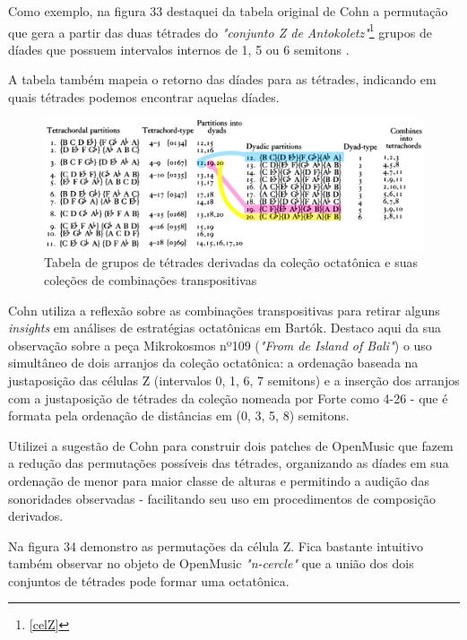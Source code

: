 \documentclass[
	12pt,				%
	openright,			%
	twoside,			%
	a4paper,			%
	english,			%
	french,				%
	spanish,			%
	brazil				%
	]{abntex2}
\begin{document}
Como exemplo, na figura 33 destaquei da tabela original de Cohn a permutação que gera a partir das duas tétrades do \textit{"conjunto Z de Antokoletz"}\footnote{ \autoref{celZ}} grupos de díades que possuem intervalos internos de 1, 5 ou 6 semitons .

A tabela também mapeia o retorno das díades para as tétrades, indicando em quais tétrades podemos encontrar aquelas díades.

\begin{figure}[!h]
	\caption{\label{fig_grafico} Tabela de grupos de tétrades derivadas da coleção octatônica e suas coleções de combinações transpositivas}
	\begin{center}
	    \includegraphics[scale=0.28]{octa/Tetrarelations03.png}
	\end{center}
\end{figure}

Cohn utiliza a reflexão sobre as combinações transpositivas para retirar alguns \textit{insights} em análises de estratégias octatônicas em Bartók. Destaco aqui da sua observação sobre a peça Mikrokosmos nº109 (\textit{"From de Island of Bali"}) o uso simultâneo de dois arranjos da coleção octatônica: a ordenação baseada na justaposição das células Z (intervalos 0, 1, 6, 7 semitons) e a inserção dos arranjos com a justaposição de tétrades da coleção nomeada por Forte como 4-26 - que é formata pela ordenação de distâncias em (0, 3, 5, 8)  semitons. 

Utilizei a sugestão de Cohn para construir dois patches de OpenMusic que fazem a redução das permutações possíveis das tétrades, organizando as díades em sua ordenação de menor para maior classe de alturas e permitindo a audição das sonoridades observadas - facilitando seu uso em procedimentos de composição derivados.

Na figura 34 demonstro as permutações da célula Z. Fica bastante intuitivo também observar no objeto de OpenMusic \textit{"n-cercle"} que a união dos dois conjuntos de tétrades pode formar uma octatônica.
\end{document}

